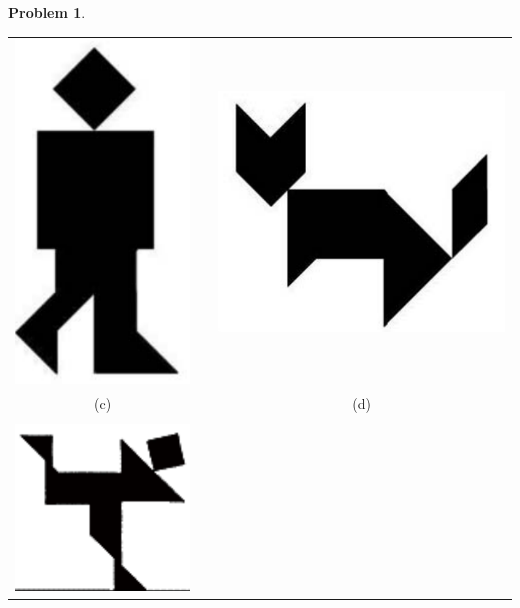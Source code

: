 \documentclass[12pt, reqno]{amsart}
\theoremstyle{remark}
\theoremstyle{definition}
\newtheorem{problem}{Problem}
\numberwithin{equation}{section}  %
\begin{document}
\begin{problem}
\begin{center}
\begin{tabular}{ccc}
\includegraphics[scale=0.4]{tangram3} & 
\qquad \qquad\qquad& 
\includegraphics[scale=0.4]{tangram4}\\
(c) && (d)\\
\\
\includegraphics[scale=0.7]{tangram5} & 

\end{tabular}
\end{center}
\end{problem}
\end{document}
